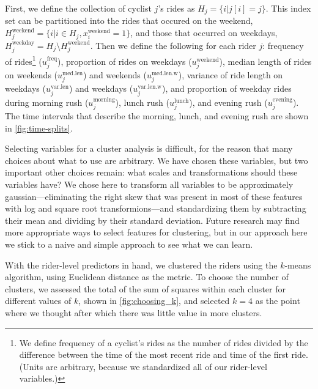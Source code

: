 \documentclass[12pt,twoside]{reedthesis}
\begin{document}
  First, we define the collection of cyclist \(j\)'s rides as
  \(H_j = \{ i | j[i] = j \}\). This index set can be partitioned into the
  rides that occured on the weekend,
  \(H_j^\text{weekend} = \{ i | i \in H_j, x_i^\text{weekend} = 1\}\), and
  those that occurred on weekdays,
  \(H_j^\text{weekday} = H_j \setminus H_j^\text{weekend}\). Then we
  define the following for each rider \(j\): frequency of rides\footnote{We
    define frequency of a cyclist's rides as the number of rides divided
    by the difference between the time of the most recent ride and time of
    the first ride. (Units are arbitrary, because we standardized all of
    our rider-level variables.)} (\(u^\text{freq}_j\)), proportion of
  rides on weekdays (\(u^\text{weekend}_j\)), median length of rides on
  weekends (\(u^\text{med.len}_j\)) and weekends
  (\(u^\text{med.len.w}_j\)), variance of ride length on weekdays
  (\(u^\text{var.len}_j\)) and weekdays (\(u^\text{var.len.w}_j\)), and
  proportion of weekday rides during morning rush
  (\(u^\text{morning}_j\)), lunch rush (\(u^\text{lunch}_j\)), and evening
  rush (\(u^\text{evening}_j\)). The time intervals that describe the
  morning, lunch, and evening rush are shown in \autoref{fig:time-splits}.
  
  Selecting variables for a cluster analysis is difficult, for the reason
  that many choices about what to use are arbitrary. We have chosen these
  variables, but two important other choices remain: what scales and
  transformations should these variables have? We chose here to transform
  all variables to be approximately gaussian---eliminating the right skew
  that was present in most of these features with log and square root
  transformions---and standardizing them by subtracting their mean and
  dividing by their standard deviation. Future research may find more
  appropriate ways to select features for clustering, but in our approach
  here we stick to a naive and simple approach to see what we can learn.
  
  With the rider-level predictors in hand, we clustered the riders using
  the \(k\)-means algorithm, using Euclidean distance as the metric. To
  choose the number of clusters, we assessed the total of the sum of
  squares within each cluster for different values of \(k\), shown in
  \autoref{fig:choosing_k}, and selected \(k = 4\) as the point where we
  thought after which there was little value in more clusters.
  
\end{document}
